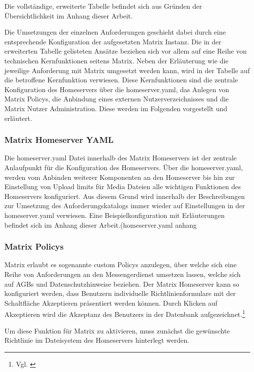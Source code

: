 Die vollständige, erweiterte Tabelle befindet sich aus Gründen der Übersichtlichkeit im Anhang dieser Arbeit.

Die Umsetzungen der einzelnen Anforderungen geschieht dabei durch eine entsprechende Konfiguration der aufgesetzten Matrix Instanz. Die in der erweiterten Tabelle gelisteten Ansätze beziehen sich vor allem auf eine Reihe von technischen Kernfunktionen seitens Matrix. Neben der Erläuterung wie die jeweilige Anforderung mit Matrix umgesetzt werden kann, wird in der Tabelle auf die betroffene Kernfunktion verwiesen. Diese Kernfunktionen sind die zentrale Konfiguration des Homeservers über die homeserver.yaml, das Anlegen von Matrix Policys,
die Anbindung eines externen Nutzerverzeichnisses und die Matrix Nutzer Administration. Diese werden im Folgenden vorgestellt und erläutert.

\subsubsection{Matrix Homeserver YAML}\label{chapter:vdmf}
Die homeserver.yaml Datei innerhalb des Matrix Homeservers ist der zentrale Anlaufpunkt für die Konfiguration des Homeservers.
Über die homeserver.yaml, werden vom Anbinden weiterer Komponenten an den Homeserver bis hin zur Einstellung von Upload limits für Media Dateien alle wichtigen Funktionen des Homeservers konfiguriert. Aus diesem Grund wird innerhalb der Beschreibungen zur Umsetzung des Anforderungskatalogs immer wieder auf Einstellungen in der homeserver.yaml verwiesen. Eine Beispielkonfiguration mit Erläuterungen befindet sich im Anhang dieser Arbeit.(homeserver.yaml anhang

\subsubsection{Matrix Policys}\label{chapter:vdmf}
Matrix erlaubt es sogenannte custom Policys anzulegen, über welche sich eine Reihe von Anforderungen an den Messengerdienst umsetzen lassen, welche sich auf AGBs und Datenschutzhinweise beziehen.
Der Matrix Homeserver kann so konfiguriert werden, dass Benutzern individuelle Richtlinienformulare mit der Schaltfläche \glqq Akzeptieren\grqq{} präsentiert werden können. Durch Klicken auf \glqq Akzeptieren\grqq{} wird die Akzeptanz des Benutzers in der Datenbank aufgezeichnet.\footnote{Vgl. \cite{Matrix.org-custom-policies2020}}

Um diese Funktion für Matrix zu aktivieren, muss zunächst die gewünschte Richtlinie im Dateisystem des Homeservers hinterlegt werden.

